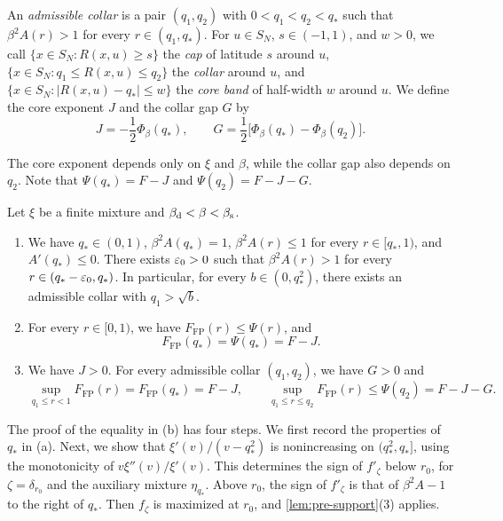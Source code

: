 \begin{definition}\label{def:pr-collar}
An \emph{admissible collar} is a pair $(q_1,q_2)$ with $0<q_1<q_2<q_*$ such that $\beta^2A(r)>1$ for every $r\in(q_1,q_*)$. For $u\in S_N$, $s\in(-1,1)$, and $w>0$, we call $\{x\in S_N\colon R(x,u)\ge s\}$ the \emph{cap} of latitude $s$ around $u$, $\{x\in S_N\colon q_1\le R(x,u)\le q_2\}$ the \emph{collar} around $u$, and $\{x\in S_N\colon|R(x,u)-q_*|\le w\}$ the \emph{core band} of half-width $w$ around $u$. We define the core exponent $J$ and the collar gap $G$ by
\begin{equation}\label{eq:pr-JG}
J=-\frac12\Phi_\beta(q_*),\qquad G=\frac12\bigl[\Phi_\beta(q_*)-\Phi_\beta(q_2)\bigr].
\end{equation}
\end{definition}

The core exponent depends only on $\xi$ and $\beta$, while the collar gap also depends on $q_2$. Note that $\Psi(q_*)=F-J$ and $\Psi(q_2)=F-J-G$.

\begin{proposition}\label{prop:pr-certificate}
Let $\xi$ be a finite mixture and $\beta_{\mathrm d}<\beta<\beta_{\mathrm s}$.
\begin{enumerate}
\item[(a)] We have $q_*\in(0,1)$, $\beta^2A(q_*)=1$, $\beta^2A(r)\le1$ for every $r\in[q_*,1)$, and $A'(q_*)\le0$. There exists $\varepsilon_0>0$ such that $\beta^2A(r)>1$ for every $r\in(q_*-\varepsilon_0,q_*)$. In particular, for every $b\in(0,q_*^2)$, there exists an admissible collar with $q_1>\sqrt b$.
\item[(b)] For every $r\in[0,1)$, we have $F_{\mathrm{FP}}(r)\le\Psi(r)$, and
\begin{equation}\label{eq:pr-touch}
F_{\mathrm{FP}}(q_*)=\Psi(q_*)=F-J .
\end{equation}
\item[(c)] We have $J>0$. For every admissible collar $(q_1,q_2)$, we have $G>0$ and
\begin{equation}\label{eq:pr-cap-collar}
\sup_{q_1\le r<1}F_{\mathrm{FP}}(r)=F_{\mathrm{FP}}(q_*)=F-J,\qquad
\sup_{q_1\le r\le q_2}F_{\mathrm{FP}}(r)\le\Psi(q_2)=F-J-G .
\end{equation}
\end{enumerate}
\end{proposition}

The proof of the equality in (b) has four steps. We first record the properties of $q_*$ in (a). Next, we show that $\xi'(v)/(v-q_*^2)$ is nonincreasing on $(q_*^2,q_*]$, using the monotonicity of $v\xi''(v)/\xi'(v)$. This determines the sign of $f'_\zeta$ below $r_0$, for $\zeta=\delta_{r_0}$ and the auxiliary mixture $\eta_{q_*}$. Above $r_0$, the sign of $f'_\zeta$ is that of $\beta^2A-1$ to the right of $q_*$. Then $f_\zeta$ is maximized at $r_0$, and \cref{lem:pre-support}(3) applies.


